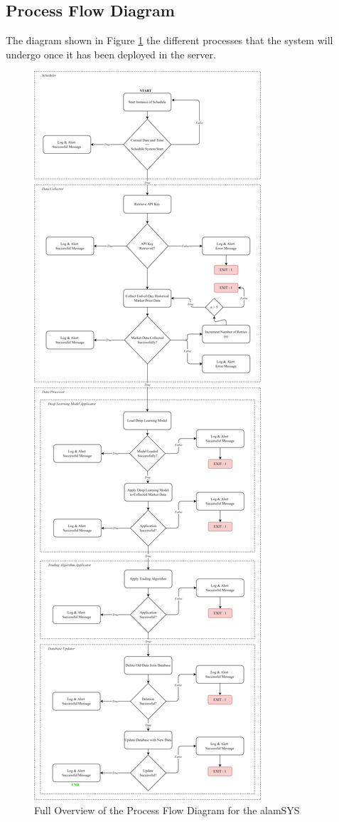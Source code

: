 \subsection{Process Flow Diagram}
\label{subsec:process_flow}
The diagram shown in Figure \ref{fig:process_flowchart} the different processes 
that the system will undergo once it has been deployed in the server.

\begin{figure}[ht]
    \centering
    \includegraphics[height=1\textheight]{./assets/Chapter_3/PFC/ProcessFlowchart.png}
    \caption{Full Overview of the Process Flow Diagram for the alamSYS}
    \label{fig:process_flowchart}
\end{figure}
\FloatBarrier

